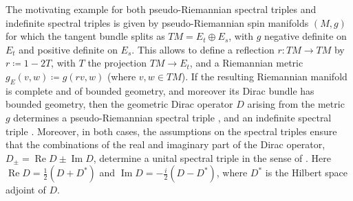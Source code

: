 \documentclass{amsart}
\theoremstyle{definition}
\theoremstyle{remark}
\DeclareMathOperator{\Ree}{Re}
\DeclareMathOperator{\Imm}{Im}
\numberwithin{equation}{section}
\begin{document}
The motivating example for both pseudo-Riemannian spectral triples and indefinite spectral triples is given by pseudo-Riemannian spin manifolds $(M,g)$ for which the tangent bundle splits as $TM=E_t\oplus E_s$, with $g$ negative definite on $E_t$ and positive definite on $E_s$. This allows to define a reflection $r\colon TM\rightarrow TM$ by $r\coloneq 1-2T$, with $T$ the projection $TM\rightarrow E_t$, and a Riemannian metric $g_E(v,w)\coloneq g(rv,w)$ (where $v,w\in TM$). If the resulting Riemannian manifold is complete and of bounded geometry, and moreover its Dirac bundle has bounded geometry, then the geometric Dirac operator $D$ arising from the metric $g$ determines a pseudo-Riemannian spectral triple \cite[Proposition 3.8]{dungen_paschke_rennie_2013}, and an indefinite spectral triple \cite[Proposition 4.5]{dungen_2019}. Moreover, in both cases, the assumptions on the spectral triples ensure that the combinations of the real and imaginary part of the Dirac operator, $D_\pm=\Ree D\pm \Imm D$, determine a unital spectral triple in the sense of \cite{carey_gayral_rennie_sukochev_2014}. Here $\Ree D=\tfrac{1}{2}(D+D^*)$ and $\Imm D=-\tfrac{i}{2}(D-D^*)$, where $D^*$ is the Hilbert space adjoint of $D$.
\end{document}
